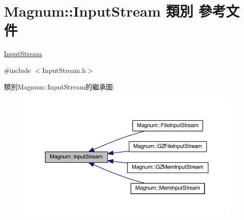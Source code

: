 \hypertarget{class_magnum_1_1_input_stream}{}\section{Magnum\+:\+:Input\+Stream 類別 參考文件}
\label{class_magnum_1_1_input_stream}


\hyperlink{class_magnum_1_1_input_stream}{Input\+Stream}.  




{\ttfamily \#include $<$Input\+Stream.\+h$>$}



類別\+Magnum\+:\+:Input\+Stream的繼承圖\+:\nopagebreak
\begin{figure}[H]
\begin{center}
\leavevmode
\includegraphics[width=350pt]{class_magnum_1_1_input_stream__inherit__graph}
\end{center}
\end{figure}
